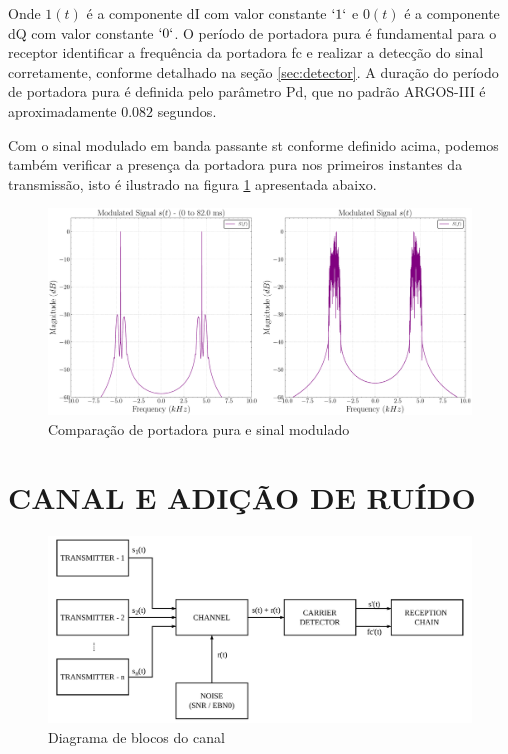 \noindent Onde $1(t)$ é a componente \gls{dI} com valor constante $`1`$ e $0(t)$ é a componente \gls{dQ} com valor constante $`0`$. O período de portadora pura é fundamental para o receptor identificar a frequência da portadora \gls{fc} e realizar a detecção do sinal corretamente, conforme detalhado na seção \ref{sec:detector}. A duração do período de portadora pura é definida pelo parâmetro \gls{Pd}, que no padrão \gls{ARGOS-III} é aproximadamente $0.082$ segundos.

Com o sinal modulado em banda passante \gls{st} conforme definido acima, podemos também verificar a presença da portadora pura nos primeiros instantes da transmissão, isto é ilustrado na figura \ref{fig:transmitter_modulator_portadora} apresentada abaixo.

\begin{figure}[H]
	\centering
	\caption{Comparação de portadora pura e sinal modulado}\label{fig:transmitter_modulator_portadora}
	\includegraphics[width=\linewidth]{assets/cap3/transmitter_modulator_portadora.pdf}
\end{figure}

\section{CANAL E ADIÇÃO DE RUÍDO}\label{sec:canal}



\begin{figure}[H]
	\centering
	\caption{Diagrama de blocos do canal}\label{fig:channel_diagram}
	\includegraphics[width=\linewidth]{assets/diagrams/channel.pdf}
\end{figure}

